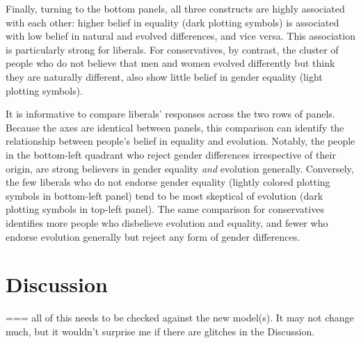 \documentclass[fignum,man]{apa}\usepackage[]{graphicx}\usepackage[]{color}
\begin{document}
Finally, turning to the bottom panels, all three constructs are highly associated with
each other:
higher belief in equality (dark plotting symbols) is associated with low
belief in natural and evolved differences, and vice versa. This 
association is particularly strong for liberals.
For conservatives, by contrast, 
the cluster of people who do not believe that men and women evolved differently but
think they are naturally different, 
also show little belief in gender equality (light
plotting symbols).  

It is informative to compare liberals' responses across the two rows of panels. 
Because
the axes are identical between panels, this comparison can identify the relationship
between people's belief in equality and evolution. Notably, the people in the bottom-left
quadrant who reject gender differences irrespective of their origin, are strong
believers in gender equality \textit{and }evolution generally. Conversely, the few
liberals who do not endorse gender equality (lightly colored plotting symbols in bottom-left panel)
tend to be most skeptical of evolution (dark plotting symbols in 
top-left panel).
The same comparison for conservatives identifies more people who disbelieve evolution
and equality, and fewer who endorse evolution generally but reject any
form of gender differences. 

\section{Discussion}

=== all of this needs to be checked against the new model(s). It may not change much, but it wouldn't surprise me if there are glitches in the Discussion.
\end{document}
